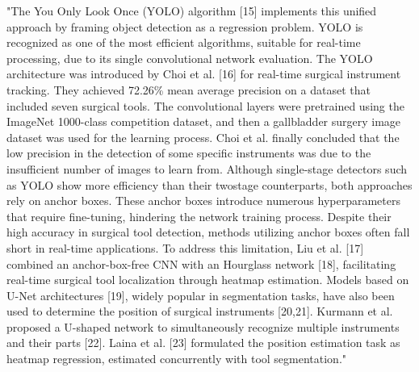 "The You Only Look Once (YOLO) algorithm [15] implements this unified approach by framing object detection as a regression problem. YOLO is recognized as one of the most efficient algorithms, suitable for real-time processing, due to its single convolutional network evaluation. The YOLO architecture was introduced by Choi et al. [16] for real-time surgical instrument tracking. They achieved 72.26\% mean average precision on a dataset that included seven surgical tools. The convolutional layers were pretrained using the ImageNet 1000-class competition dataset, and then a gallbladder surgery image dataset was used for the learning process. Choi et al. finally concluded that the low precision in the detection of some specific instruments was due to the insufficient number of images to learn from. Although single-stage detectors such as YOLO show more efficiency than their twostage counterparts, both approaches rely on anchor boxes. These anchor boxes introduce numerous hyperparameters that require fine-tuning, hindering the network training process. Despite their high accuracy in surgical tool detection, methods utilizing anchor boxes often fall short in real-time applications. To address this limitation, Liu et al. [17] combined an anchor-box-free CNN with an Hourglass network [18], facilitating real-time surgical tool localization through heatmap estimation. Models based on U-Net architectures [19], widely popular in segmentation tasks, have also been used to determine the position of surgical instruments [20,21]. Kurmann et al. proposed a U-shaped network to simultaneously recognize multiple instruments and their parts [22]. Laina et al. [23] formulated the position estimation task as heatmap regression, estimated concurrently with tool segmentation."


